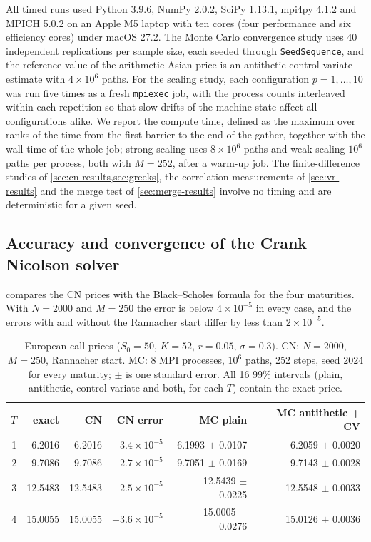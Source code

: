 \documentclass[11pt,a4paper]{article}
\begin{document}
All timed runs used Python 3.9.6, NumPy 2.0.2, SciPy 1.13.1, mpi4py 4.1.2 and MPICH 5.0.2 on an Apple M5 laptop with ten cores (four performance and six efficiency cores) under macOS 27.2.
The Monte Carlo convergence study uses 40 independent replications per sample size, each seeded through \texttt{SeedSequence}, and the reference value of the arithmetic Asian price is an antithetic control-variate estimate with $4\times10^6$ paths.
For the scaling study, each configuration $p=1,\dots,10$ was run five times as a fresh \texttt{mpiexec} job, with the process counts interleaved within each repetition so that slow drifts of the machine state affect all configurations alike.
We report the compute time, defined as the maximum over ranks of the time from the first barrier to the end of the gather, together with the wall time of the whole job; strong scaling uses $8\times10^6$ paths and weak scaling $10^6$ paths per process, both with $M=252$, after a warm-up job.
The finite-difference studies of \cref{sec:cn-results,sec:greeks}, the correlation measurements of \cref{sec:vr-results} and the merge test of \cref{sec:merge-results} involve no timing and are deterministic for a given seed.

\subsection{Accuracy and convergence of the Crank--Nicolson solver}\label{sec:cn-results}

 compares the CN prices with the Black--Scholes formula for the four maturities.
With $N=2000$ and $M=250$ the error is below $4\times10^{-5}$ in every case, and the errors with and without the Rannacher start differ by less than $2\times10^{-5}$.

\begin{table}[ht]
\centering
\caption{European call prices ($S_0=50$, $K=52$, $r=0.05$, $\sigma=0.3$). CN: $N=2000$, $M=250$, Rannacher start. MC: 8 MPI processes, $10^6$ paths, 252 steps, seed 2024 for every maturity; $\pm$ is one standard error. All 16 99\% intervals (plain, antithetic, control variate and both, for each $T$) contain the exact price.}\label{tab:price}
\small
\begin{tabular}{rrrrrr}
\toprule
$T$ & exact & CN & CN error & MC plain & MC antithetic + CV \\
\midrule
1 & 6.2016 & 6.2016 & $-3.4\times10^{-5}$ & 6.1993 $\pm$ 0.0107 & 6.2059 $\pm$ 0.0020 \\
2 & 9.7086 & 9.7086 & $-2.7\times10^{-5}$ & 9.7051 $\pm$ 0.0169 & 9.7143 $\pm$ 0.0028 \\
3 & 12.5483 & 12.5483 & $-2.5\times10^{-5}$ & 12.5439 $\pm$ 0.0225 & 12.5548 $\pm$ 0.0033 \\
4 & 15.0055 & 15.0055 & $-3.6\times10^{-5}$ & 15.0005 $\pm$ 0.0276 & 15.0126 $\pm$ 0.0036 \\
\bottomrule
\end{tabular}
\end{table}
\end{document}
